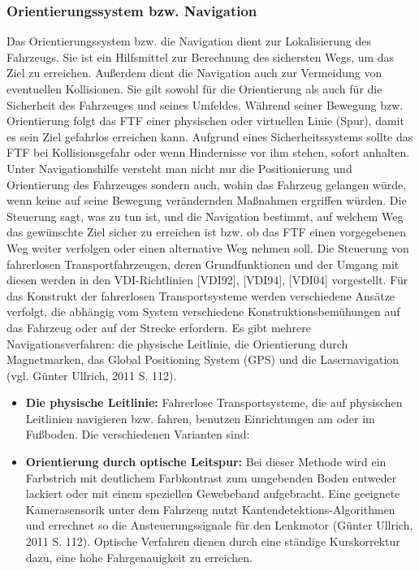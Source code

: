 \begin{itemize}
\subsubsection{Orientierungssystem bzw. Navigation}
Das Orientierungssystem bzw. die Navigation dient zur Lokalisierung des Fahrzeugs. Sie ist ein Hilfsmittel zur Berechnung des sichersten Wegs, um das Ziel zu erreichen. Au\ss erdem dient die Navigation auch zur Vermeidung von eventuellen Kollisionen. Sie gilt sowohl f\"ur die Orientierung als auch f\"ur die Sicherheit des Fahrzeuges und seines Umfeldes. W\"ahrend seiner Bewegung bzw. Orientierung folgt das FTF einer physischen oder virtuellen Linie (Spur), damit es sein Ziel gefahrlos erreichen kann. Aufgrund eines Sicherheitssystems sollte das FTF bei Kollisionsgefahr oder wenn Hindernisse vor ihm stehen, sofort anhalten. 
Unter Navigationshilfe versteht man nicht nur die Positionierung und Orientierung des Fahrzeuges sondern auch, wohin das Fahrzeug gelangen w\"urde, wenn keine auf seine Bewegung ver\"andernden Ma\ss nahmen ergriffen würden.
Die Steuerung sagt, was zu tun ist, und die Navigation bestimmt, auf welchem Weg das gew\"unschte Ziel sicher zu erreichen ist bzw. ob das FTF einen vorgegebenen Weg weiter verfolgen oder einen alternative Weg nehmen soll.
Die Steuerung von fahrerlosen Transportfahrzeugen, deren Grundfunktionen und der Umgang mit diesen werden in den VDI-Richtlinien [VDI92], [VDI94], [VDI04] vorgestellt.
F\"ur das Konstrukt der fahrerlosen Transportsysteme werden verschiedene Ans\"atze verfolgt, die abh\"angig vom System verschiedene Konstruktionsbem\"uhungen auf das Fahrzeug oder auf der Strecke erfordern.
Es gibt mehrere Navigationsverfahren: die physische Leitlinie, die Orientierung durch Magnetmarken, das Global Positioning System (GPS) und die Lasernavigation (vgl. G\"unter Ullrich, 2011 S. 112).
\begin{itemize}
	\item \textbf{Die physische Leitlinie:}  Fahrerlose Transportsysteme, die auf physischen Leitlinien navigieren bzw. fahren, benutzen Einrichtungen am oder im Fu\ss boden. Die verschiedenen Varianten sind:
 \item \textbf{Orientierung durch optische Leitspur:} Bei dieser Methode wird ein Farbstrich mit deutlichem Farbkontrast zum umgebenden Boden entweder lackiert oder mit einem speziellen Gewebeband aufgebracht.
Eine geeignete Kamerasensorik unter dem Fahrzeug nutzt Kantendetektions-Algorithmen und errechnet so die Ansteuerungssignale f\"ur den Lenkmotor (G\"unter Ullrich, 2011 S. 112).
Optische Verfahren dienen durch eine st\"andige Kurskorrektur dazu, eine hohe Fahrgenauigkeit zu erreichen. 

\end{itemize}
\end{itemize}
